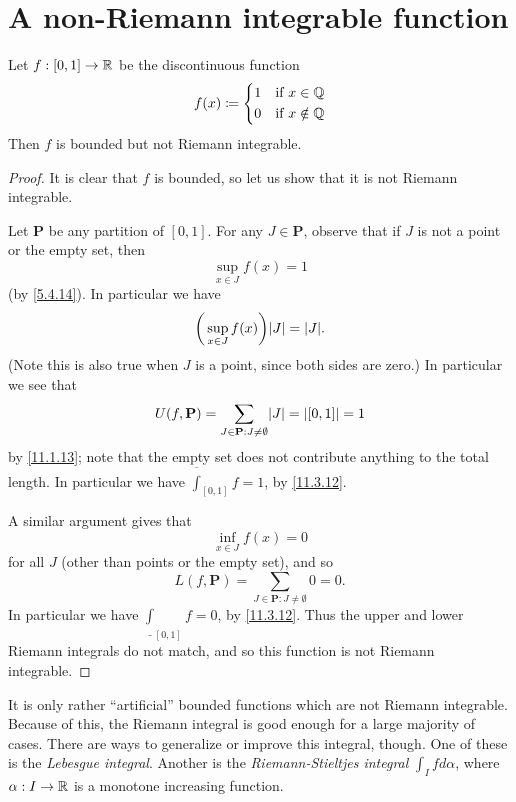 \section{A non-Riemann integrable function}\label{sec:11.7}

\begin{prop}\label{11.7.1}
  Let \(f : [0, 1] \to \mathbb{R}\) be the discontinuous function
  \[
    f(x) \coloneqq \begin{dcases}
      1 & \text{if } x \in \mathbb{Q}    \\
      0 & \text{if } x \notin \mathbb{Q}
    \end{dcases}
  \]
  Then \(f\) is bounded but not Riemann integrable.
\end{prop}

\begin{proof}
  It is clear that \(f\) is bounded, so let us show that it is not Riemann integrable.

  Let \(\mathbf{P}\) be any partition of \([0, 1]\).
  For any \(J \in \mathbf{P}\), observe that if \(J\) is not a point or the empty set, then
  \[
    \sup_{x \in J} f(x) = 1
  \]
  (by \cref{5.4.14}).
  In particular we have
  \[
    \bigg(\sup_{x \in J} f(x)\bigg) \abs{J} = \abs{J}.
  \]
  (Note this is also true when \(J\) is a point, since both sides are zero.)
  In particular we see that
  \[
    U(f, \mathbf{P}) = \sum_{J \in \mathbf{P} : J \neq \emptyset} \abs{J} = \abs{[0, 1]} = 1
  \]
  by \cref{11.1.13};
  note that the empty set does not contribute anything to the total length.
  In particular we have \(\overline{\int}_{[0, 1]} f = 1\), by \cref{11.3.12}.

  A similar argument gives that
  \[
    \inf_{x \in J} f(x) = 0
  \]
  for all \(J\) (other than points or the empty set), and so
  \[
    L(f, \mathbf{P}) = \sum_{J \in \mathbf{P} : J \neq \emptyset} 0 = 0.
  \]
  In particular we have \(\underline{\int}_{[0, 1]} f = 0\), by \cref{11.3.12}.
  Thus the upper and lower Riemann integrals do not match, and so this function is not Riemann integrable.
\end{proof}

\begin{rmk}\label{11.7.2}
  It is only rather ``artificial'' bounded functions which are not Riemann integrable.
  Because of this, the Riemann integral is good enough for a large majority of cases.
  There are ways to generalize or improve this integral, though.
  One of these is the \emph{Lebesgue integral}.
  Another is the \emph{Riemann-Stieltjes integral} \(\int_I f d\alpha\), where \(\alpha : I \to \mathbb{R}\) is a monotone increasing function.
\end{rmk}